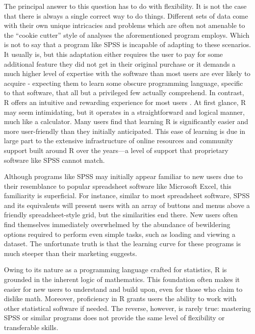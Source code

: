 The principal answer to this question has to do with flexibility. It is not the case that there is always a single correct way to do things.  Different sets of data come with their own unique intricacies and problems which are often not amenable to the ``cookie cutter'' style of analyses the aforementioned program employs. Which is not to say that a program like SPSS is incapable of adapting to these scenarios. It usually is, but this adaptation either requires the user to pay for some additional feature they did not get in their original purchase or it demands a much higher level of expertise with the software than most users are ever likely to acquire - expecting them to learn some obscure programming language, specific to that software, that all but a privileged few actually comprehend. In contrast, R offers an intuitive and rewarding experience for most users \parencite{Bro}. At first glance, R may seem intimidating, but it operates in a straightforward and logical manner, much like a calculator. Many users find that learning R is significantly easier and more user-friendly than they initially anticipated. This ease of learning is due in large part to the extensive infrastructure of online resources and community support built around R over the years—a level of support that proprietary software like SPSS cannot match.

Although programs like SPSS may initially appear familiar to new users due to their resemblance to popular spreadsheet software like Microsoft Excel, this familiarity is superficial. For instance, similar to most spreadsheet software, SPSS and its equivalents will present users with an array of buttons and menus above a friendly spreadsheet-style grid, but the similarities end there. New users often find themselves immediately overwhelmed by the abundance of bewildering options required to perform even simple tasks, such as loading and viewing a dataset. The unfortunate truth is that the learning curve for these programs is much steeper than their marketing suggests.

Owing to its nature as a programming language crafted for statistics, R is grounded in the inherent logic of mathematics. This foundation often makes it easier for new users to understand and build upon, even for those who claim to dislike math. Moreover, proficiency in R grants users the ability to work with other statistical software if needed. The reverse, however, is rarely true: mastering SPSS or similar programs does not provide the same level of flexibility or transferable skills.

